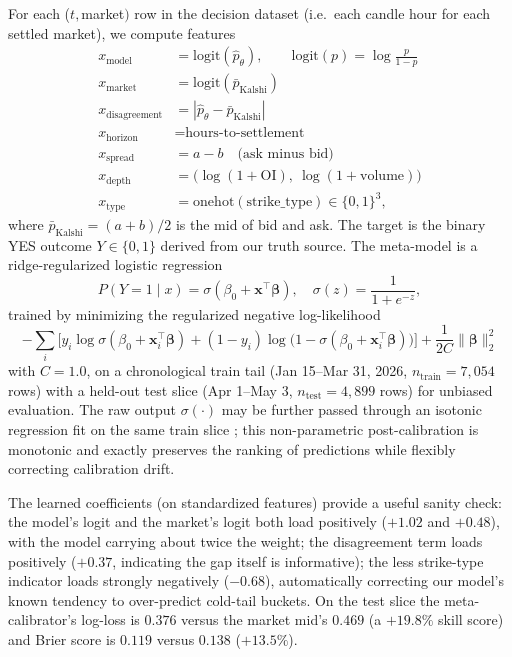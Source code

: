 \documentclass[11pt]{article}
\begin{document}
For each ($t, $market$)$ row in the decision dataset (i.e.\ each candle
hour for each settled market), we compute features
\begin{align*}
x_{\text{model}} &= \mathrm{logit}(\hat{p}_\theta), \qquad \mathrm{logit}(p) = \log \tfrac{p}{1-p} \\
x_{\text{market}} &= \mathrm{logit}(\bar{p}_{\text{Kalshi}}) \\
x_{\text{disagreement}} &= |\hat{p}_\theta - \bar{p}_{\text{Kalshi}}| \\
x_{\text{horizon}} &= \text{hours-to-settlement} \\
x_{\text{spread}} &= a - b\quad\text{(ask minus bid)} \\
x_{\text{depth}} &= \bigl( \log(1+\text{OI}),\ \log(1+\text{volume})\bigr) \\
x_{\text{type}} &= \mathrm{onehot}(\mathrm{strike\_type}) \in \{0,1\}^3,
\end{align*}
where $\bar{p}_{\text{Kalshi}} = (a+b)/2$ is the mid of bid and ask. The
target is the binary YES outcome $Y \in \{0, 1\}$ derived from our truth
source. The meta-model is a ridge-regularized logistic regression
\begin{equation}
P(Y = 1 \mid x) = \sigma\!\left(\beta_0 + \mathbf{x}^\top \boldsymbol{\beta}\right),\quad \sigma(z) = \frac{1}{1+e^{-z}},
\label{eq:meta-logreg}
\end{equation}
trained by minimizing the regularized negative log-likelihood
\[
-\sum_i \bigl[ y_i \log \sigma(\beta_0 + \mathbf{x}_i^\top \boldsymbol{\beta})
+ (1-y_i) \log\bigl(1 - \sigma(\beta_0 + \mathbf{x}_i^\top \boldsymbol{\beta})\bigr) \bigr]
+ \frac{1}{2C} \lVert \boldsymbol{\beta} \rVert_2^2
\]
with $C = 1.0$, on a chronological train tail (Jan 15--Mar 31, 2026,
$n_\text{train} = 7{,}054$ rows) with a held-out test slice (Apr 1--May 3,
$n_\text{test} = 4{,}899$ rows) for unbiased evaluation. The raw output
$\sigma(\cdot)$ may be further passed through an isotonic regression
fit on the same train slice
\citep{zadrozny2002transforming,niculescu2005predicting}; this
non-parametric post-calibration is monotonic and exactly preserves the
ranking of predictions while flexibly correcting calibration drift.

The learned coefficients (on standardized features) provide a useful sanity
check: the model's logit and the market's logit both load positively
($+1.02$ and $+0.48$), with the model carrying about twice the weight; the
disagreement term loads positively ($+0.37$, indicating the gap itself is
informative); the \textsf{less} strike-type indicator loads strongly
negatively ($-0.68$), automatically correcting our model's known tendency
to over-predict cold-tail buckets. On the test slice the meta-calibrator's
log-loss is $0.376$ versus the market mid's $0.469$ (a $+19.8\%$ skill
score) and Brier score is $0.119$ versus $0.138$ ($+13.5\%$).
\end{document}
